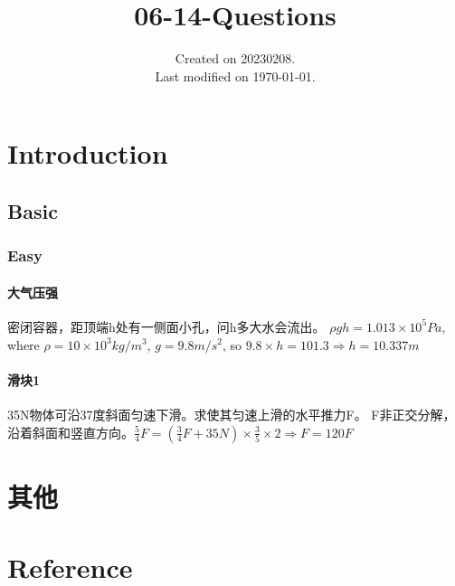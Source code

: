 \documentclass[UTF8]{../06-Physics}
\begin{document}
\title{06-14-Questions}
\date{Created on 20230208.\\   Last modified on \today.}
\maketitle
\tableofcontents


\chapter{Introduction}




\section{Basic}

\subsection{Easy}

\subsubsection{大气压强}
密闭容器，距顶端h处有一侧面小孔，问h多大水会流出。
$\rho g h = 1.013 \times 10^5 Pa$, where $ \rho = 10 \times 10^3 kg /m^3$, $g = 9.8 m / s^2 $, so $ 9.8 \times h = 101.3  \Rightarrow h = 10.337 m$

\subsubsection{滑块1}
35N物体可沿37度斜面匀速下滑。求使其匀速上滑的水平推力F。
F非正交分解，沿着斜面和竖直方向。$\frac{5}{4} F = (\frac{3}{4} F + 35N) \times \frac{3}{5} \times 2 \Longrightarrow F = 120F $

\chapter{其他}



\chapter{Reference}
\end{document}
